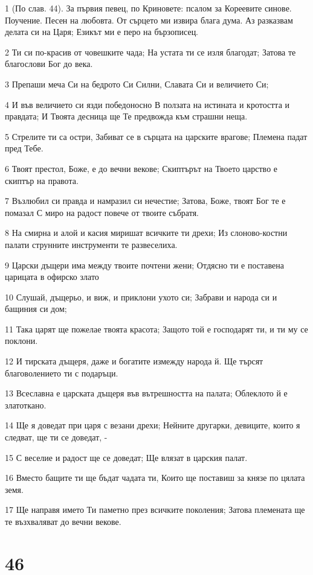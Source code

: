 \par 1 (По слав. 44). За първия певец, по Криновете: псалом за Кореевите синове. Поучение. Песен на любовта. От сърцето ми извира блага дума. Аз разказвам делата си на Царя; Езикът ми е перо на бързописец.
\par 2 Ти си по-красив от човешките чада; На устата ти се изля благодат; Затова те благослови Бог до века.
\par 3 Препаши меча Си на бедрото Си Силни, Славата Си и величието Си;
\par 4 И във величието си язди победоносно В ползата на истината и кротостта и правдата; И Твоята десница ще Те предвожда към страшни неща.
\par 5 Стрелите ти са остри, Забиват се в сърцата на царските врагове; Племена падат пред Тебе.
\par 6 Твоят престол, Боже, е до вечни векове; Скиптърът на Твоето царство е скиптър на правота.
\par 7 Възлюбил си правда и намразил си нечестие; Затова, Боже, твоят Бог те е помазал С миро на радост повече от твоите събратя.
\par 8 На смирна и алой и касия миришат всичките ти дрехи; Из слоново-костни палати струнните инструменти те развеселиха.
\par 9 Царски дъщери има между твоите почтени жени; Отдясно ти е поставена царицата в офирско злато
\par 10 Слушай, дъщерьо, и виж, и приклони ухото си; Забрави и народа си и бащиния си дом;
\par 11 Така царят ще пожелае твоята красота; Защото той е господарят ти, и ти му се поклони.
\par 12 И тирската дъщеря, даже и богатите измежду народа й. Ще търсят благоволението ти с подаръци.
\par 13 Всеславна е царската дъщеря във вътрешността на палата; Облеклото й е златоткано.
\par 14 Ще я доведат при царя с везани дрехи; Нейните другарки, девиците, които я следват, ще ти се доведат, -
\par 15 С веселие и радост ще се доведат; Ще влязат в царския палат.
\par 16 Вместо бащите ти ще бъдат чадата ти, Които ще поставиш за князе по цялата земя.
\par 17 Ще направя името Ти паметно през всичките поколения; Затова племената ще те възхваляват до вечни векове.

\chapter{46}

